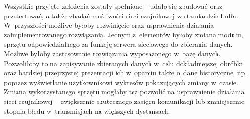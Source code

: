 Wszystkie przyjęte założenia zostały spełnione -- udało się zbudować oraz przetestować, a także zbadać możliwości sieci
czujnikowej w standardzie LoRa. W~przyszłości możliwe byłoby rozwinięcie oraz usprawnienie działania zaimplementowanego
rozwiązania. Jednym z~elementów byłoby zmiana modułu, sprzętu odpowiedzialnego za funkcję serwera sieciowego do
zbierania danych. Możliwe byłoby zastosowanie rozwiązania wyposażonego w~bazę danych. Pozwoliłoby to na zapisywanie
zbieranych danych w~celu dokładniejszej obróbki oraz bardziej przejrzystej prezentacji ich w~oparciu także o~dane
historyczne, np. poprzez wyświetlanie użytkownikowi wykresów pokazujących zmiany w~czasie. Zmiana wykorzystanego sprzętu
mogłaby też pozwolić na usprawnienie działania sieci czujnikowej -- zwiększenie skutecznego zasięgu komunikacji lub
zmniejszenie stopnia błędu w~transmisjach na większych dystansach.